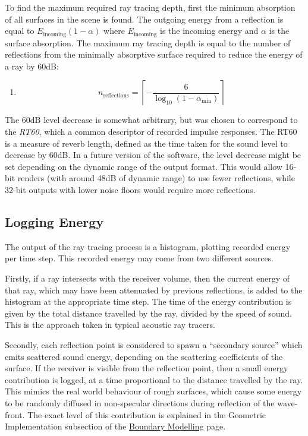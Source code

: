 \documentclass[]{scrreprt}
\providecommand{\tightlist}{%
  \setlength{\itemsep}{0pt}\setlength{\parskip}{0pt}}
\begin{document}
To find the maximum required ray tracing depth, first the minimum
absorption of all surfaces in the scene is found. The outgoing energy
from a reflection is equal to \(E_\text{incoming}(1-\alpha)\) where
\(E_\text{incoming}\) is the incoming energy and \(\alpha\) is the
surface absorption. The maximum ray tracing depth is equal to the number
of reflections from the minimally absorptive surface required to reduce
the energy of a ray by 60dB:

\begin{enumerate}
\def\labelenumi{(\arabic{enumi})}
\setcounter{enumi}{8}
\tightlist
\item
  \[n_\text{reflections}=\left\lceil-\frac{6}{\log_{10}(1-\alpha_\text{min})}\right\rceil\]
\end{enumerate}

The 60dB level decrease is somewhat arbitrary, but was chosen to
correspond to the \emph{RT60}, which a common descriptor of recorded
impulse responses. The RT60 is a measure of reverb length, defined as
the time taken for the sound level to decrease by 60dB. In a future
version of the software, the level decrease might be set depending on
the dynamic range of the output format. This would allow 16-bit renders
(with around 48dB of dynamic range) to use fewer reflections, while
32-bit outputs with lower noise floors would require more reflections.

\subsection{Logging Energy}\label{logging-energy}

The output of the ray tracing process is a histogram, plotting recorded
energy per time step. This recorded energy may come from two different
sources.

Firstly, if a ray intersects with the receiver volume, then the current
energy of that ray, which may have been attenuated by previous
reflections, is added to the histogram at the appropriate time step. The
time of the energy contribution is given by the total distance travelled
by the ray, divided by the speed of sound. This is the approach taken in
typical acoustic ray tracers.

Secondly, each reflection point is considered to spawn a ``secondary
source'' which emits scattered sound energy, depending on the scattering
coefficients of the surface. If the receiver is visible from the
reflection point, then a small energy contribution is logged, at a time
proportional to the distance travelled by the ray. This mimics the real
world behaviour of rough surfaces, which cause some energy to be
randomly diffused in non-specular directions during reflection of the
wave-front. The exact level of this contribution is explained in the
Geometric Implementation subsection of the
\href{\%7B\%7B\%20site.baseurl\%20\%7D\%7D\%7B\%\%20link\%20boundary.md\%20\%\%7D}{Boundary
Modelling} page.
\end{document}
